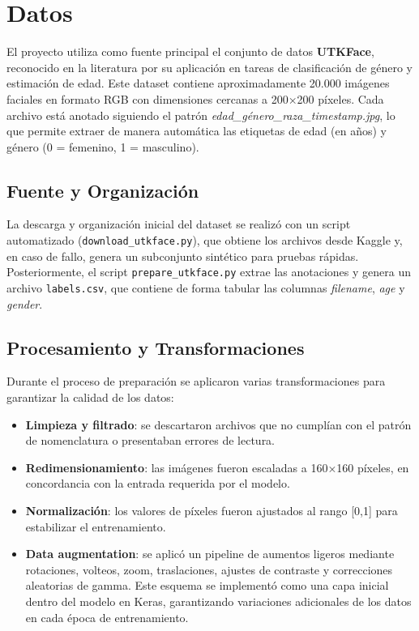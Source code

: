 \section{Datos}
El proyecto utiliza como fuente principal el conjunto de datos \textbf{UTKFace},
reconocido en la literatura por su aplicación en tareas de clasificación de género y 
estimación de edad. Este dataset contiene aproximadamente 20.000 imágenes faciales en formato RGB con 
dimensiones cercanas a 200×200 píxeles. 
Cada archivo está anotado siguiendo el patrón \textit{edad\_género\_raza\_timestamp.jpg}, 
lo que permite extraer de manera automática las etiquetas de edad (en años) y género (0 = femenino, 1 = masculino).

\subsection{Fuente y Organización}
La descarga y organización inicial del dataset se realizó con un script automatizado (\texttt{download\_utkface.py}), 
que obtiene los archivos desde Kaggle y, en caso de fallo, genera un subconjunto sintético para pruebas rápidas. 
Posteriormente, el script \texttt{prepare\_utkface.py} extrae las anotaciones y genera un archivo \texttt{labels.csv}, 
que contiene de forma tabular las columnas \textit{filename}, \textit{age} y \textit{gender}.

\subsection{Procesamiento y Transformaciones}
Durante el proceso de preparación se aplicaron varias transformaciones para garantizar la calidad de los datos:

\begin{itemize}
  \item \textbf{Limpieza y filtrado}: se descartaron archivos que no cumplían con el patrón de nomenclatura o presentaban errores de lectura.
  \item \textbf{Redimensionamiento}: las imágenes fueron escaladas a 160×160 píxeles, en concordancia con la entrada requerida por el modelo.
  \item \textbf{Normalización}: los valores de píxeles fueron ajustados al rango [0,1] para estabilizar el entrenamiento.
  \item \textbf{Data augmentation}: se aplicó un pipeline de aumentos ligeros mediante rotaciones, volteos, zoom, traslaciones, ajustes de contraste y correcciones aleatorias de gamma. Este esquema se implementó como una capa inicial dentro del modelo en Keras, garantizando variaciones adicionales de los datos en cada época de entrenamiento.
\end{itemize}

